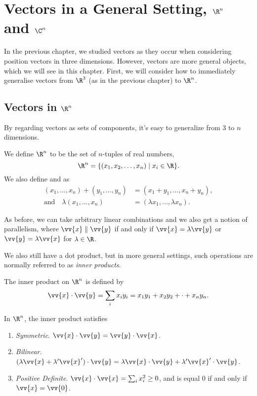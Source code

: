 \chapter{Vectors in a General Setting, $\R^n$ and $\C^n$}

In the previous chapter, we studied vectors as they occur when considering position vectors in three dimensions. However, vectors are more general objects, which we will see in this chapter. First, we will consider how to immediately generalise vectors from $\R^3$ (as in the previous chapter) to $\R^n$.

\section{Vectors in $\R^n$}

By regarding vectors as sets of components, it's easy to generalize from 3 to $n$ dimensions.

\begin{definition}[$\R^n$ Space]
    We define $\R^n$ to be the set of $n$-tuples of real numbers,
    $$
    \R^n = \{(x_1, x_2, \dots, x_n) \mid x_i \in \R\}.
    $$ 
    We also define  and  as
    \begin{align*}
        (x_1, \dots, x_n) + (y_1, \dots, y_n) &= (x_1 + y_1, \dots, x_n + y_n),\\
       \text{and} \quad \lambda (x_1, \dots, x_n) &= (\lambda x_1, \dots, \lambda x_n).
    \end{align*}
\end{definition}

As before, we can take arbitrary linear combinations and we also get a notion of parallelism, where $\vv{x} \parallel \vv{y}$ if and only if $\vv{x} = \lambda \vv{y}$ or $\vv{y} = \lambda \vv{x}$ for $\lambda \in \R$.

We also still have a dot product, but in more general settings, such operations are normally referred to as \emph{inner products}.

\begin{definition}
    The inner product on $\R^n$ is defined by
    $$
    \vv{x} \cdot \vv{y} = \sum_{i} x_i y_i = x_1 y_1 + x_2 y_2 + \cdot + x_n y_n.
    $$
\end{definition}

\begin{proposition}
    In $\R^n$, the inner product satisfies
    \begin{enumerate}[label=(\roman*)]
        \item \emph{Symmetric}. $\vv{x} \cdot \vv{y} = \vv{y} \cdot \vv{x}$.
        \item \emph{Bilinear}. $(\lambda \vv{x} + \lambda' \vv{x}') \cdot \vv{y} = \lambda \vv{x} \cdot \vv{y} + \lambda' \vv{x}' \cdot \vv{y}$.
        \item \emph{Positive Definite}. $\vv{x} \cdot \vv{x} = \sum_{i} x_i ^2 \geq 0$, and is equal 0 if and only if $\vv{x} = \vv{0}$. 
    \end{enumerate}
\end{proposition}

